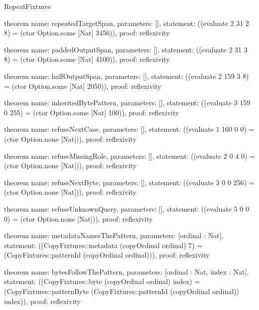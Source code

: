 \begin{lexlean}{RepeatFixtures}
\begin{semanticmodule}
theorem{
  name: repeatedTargetSpan,
  parameters: [],
  statement: ((evaluate 2 31 2 8) = (ctor Option.some [Nat] 3456)),
  proof: reflexivity{}
}

theorem{
  name: paddedOutputSpan,
  parameters: [],
  statement: ((evaluate 2 31 3 8) = (ctor Option.some [Nat] 4100)),
  proof: reflexivity{}
}

theorem{
  name: halfOutputSpan,
  parameters: [],
  statement: ((evaluate 2 159 3 8) = (ctor Option.some [Nat] 2050)),
  proof: reflexivity{}
}

theorem{
  name: inheritedBytePattern,
  parameters: [],
  statement: ((evaluate 3 159 0 255) = (ctor Option.some [Nat] 100)),
  proof: reflexivity{}
}

theorem{
  name: refuseNextCase,
  parameters: [],
  statement: ((evaluate 1 160 0 0) = (ctor Option.none [Nat])),
  proof: reflexivity{}
}

theorem{
  name: refuseMissingRole,
  parameters: [],
  statement: ((evaluate 2 0 4 0) = (ctor Option.none [Nat])),
  proof: reflexivity{}
}

theorem{
  name: refuseNextByte,
  parameters: [],
  statement: ((evaluate 3 0 0 256) = (ctor Option.none [Nat])),
  proof: reflexivity{}
}

theorem{
  name: refuseUnknownQuery,
  parameters: [],
  statement: ((evaluate 5 0 0 0) = (ctor Option.none [Nat])),
  proof: reflexivity{}
}

theorem{
  name: metadataNamesThePattern,
  parameters: [ordinal : Nat],
  statement: ((CopyFixtures::metadata (copyOrdinal ordinal) 7) = (CopyFixtures::patternId (copyOrdinal ordinal))),
  proof: reflexivity{}
}

theorem{
  name: bytesFollowThePattern,
  parameters: [ordinal : Nat, index : Nat],
  statement: ((CopyFixtures::byte (copyOrdinal ordinal) index) = (CopyFixtures::patternByte (CopyFixtures::patternId (copyOrdinal ordinal)) index)),
  proof: reflexivity{}
}
\end{semanticmodule}
\end{lexlean}
